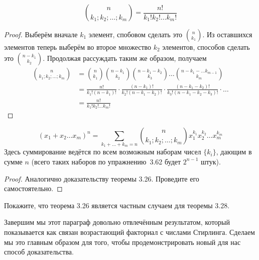 \begin{thm}
$${n \choose k_1; k_2;\ldots; k_m} = \frac{n!}{k_1!k_2!\ldots k_m!}$$
\end{thm}
\begin{proof}
Выберём вначале $k_1$ элемент, спобовом сделать это $n\choose k_1$. Из оставшихся элементов теперь выберём во второе множество $k_2$ элементов, способов сделать это $n-k_1\choose k_2$. Продолжая рассуждать таким же образом, получаем
\begin{align*}
{n \choose k_1; k_2;\ldots; k_m} & = {n\choose k_1}{n-k_1\choose k_2}{n-k_1-k_2\choose k_3}\ldots{n-k_1-\ldots k_{m-1}\choose k_m} \\
&= \frac{n!}{k_1!(n-k_1)!}\cdot\frac{(n-k_1)!}{k_2!(n-k_1-k_2)!}\cdot\frac{(n-k_1-k_2)!}{k_3!(n-k_1-k_2-k_3)!}\cdot\ldots\\
&=\frac{n!}{k_1!k_2!\ldots k_m!}
\end{align*}
\end{proof}

\begin{thm}
$$(x_1+x_2\ldots x_m)^n = \sum_{k_1+\ldots + k_m = n}{n\choose k_1;k_2;\ldots;k_m}x_1^{k_1}x_2^{k_2}\ldots x_m^{k_m}$$
Здесь суммирование ведётся по всем возможным наборам чисел $\{k_i\}$, дающим в сумме $n$ (всего таких наборов по упражнению~3.62 будет $2^{n-1}$ штук).
\end{thm}
\begin{proof}
Аналогично доказательству теоремы 3.26. Проведите его самостоятельно.
\end{proof}

\begin{exercise}
Покажите, что теорема 3.26 является частным случаем для теоремы 3.28.
\end{exercise}

Завершим мы этот параграф довольно отвлечённым результатом, который показывается как связан возрастающий факториал с числами Стирлинга. Сделаем мы это главным образом для того, чтобы продемонстрировать новый для нас способ доказательства.

